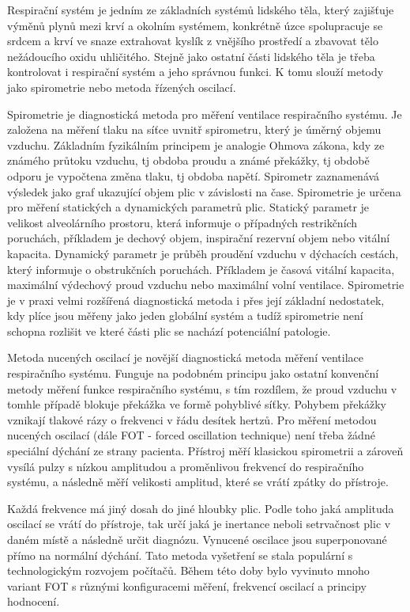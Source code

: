 
Respirační systém je jedním ze základních systémů lidského těla, který zajišťuje výměnů plynů mezi krví a okolním systémem, konkrétně úzce spolupracuje se srdcem a krví ve snaze extrahovat kyslík z vnějšího prostředí a zbavovat tělo nežádoucího oxidu uhličitého. \cite{muni} Stejně jako ostatní části lidského těla je třeba kontrolovat i respirační systém a jeho správnou funkci. K tomu slouží metody jako spirometrie nebo metoda řízených oscilací. 

Spirometrie je diagnostická metoda pro měření ventilace respiračního systému. Je založena na měření tlaku na síťce uvnitř spirometru, který je úměrný objemu vzduchu. \cite{MEFANET} Základním fyzikálním principem je analogie Ohmova zákona, kdy ze známého průtoku vzduchu, tj obdoba proudu a známé překážky, tj obdobě odporu je vypočtena změna tlaku, tj obdoba napětí. Spirometr zaznamenává výsledek jako graf ukazující objem plic v závislosti na čase. \cite{Medicon} Spirometrie je určena pro měření statických a dynamických parametrů plic. Statický parametr  je velikost alveolárního prostoru, která informuje o případných restrikčních poruchách, příkladem je dechový objem, inspirační rezervní objem nebo vitální kapacita. Dynamický parametr je průběh proudění vzduchu v dýchacích cestách, který informuje o obstrukčních poruchách. Příkladem je časová vitální kapacita, maximální výdechový proud vzduchu nebo maximální volní ventilace. \cite{lekfak}
Spirometrie je v praxi velmi rozšířená diagnostická metoda i přes její základní nedostatek, kdy plíce jsou měřeny jako jeden globální systém a tudíž spirometrie není schopna rozlišit ve které části plic se nachází potenciální patologie.

Metoda nucených oscilací je novější diagnostická metoda měření ventilace respiračního systému. Funguje na podobném principu jako ostatní konvenční metody měření funkce respiračního systému, s tím rozdílem, že proud vzduchu v tomhle případě blokuje překážka ve formě pohyblivé síťky. Pohybem překážky vznikají tlakové rázy o frekvenci v řádu desítek hertzů. Pro měření metodou nucených oscilací (dále FOT - forced oscillation technique) není třeba žádné speciální dýchání ze strany pacienta. Přístroj měří klasickou spirometrii a zároveň vysílá pulzy s nízkou amplitudou a proměnlivou frekvencí do respiračního systému, a následně měří velikosti amplitud, které se vrátí zpátky do přístroje. \cite{Oostveen}

Každá frekvence má jiný dosah do jiné hloubky plic. Podle toho jaká amplituda oscilací se vrátí do přístroje,  tak určí jaká je inertance neboli setrvačnost plic v daném místě a následně určit diagnózu. \cite{Oostveen}
Vynucené oscilace jsou superponované přímo na normální dýchání. Tato metoda vyšetření se stala populární s technologickým rozvojem počítačů. \cite{Vlcek2018} Během této doby bylo vyvinuto mnoho variant FOT s různými konfiguracemi měření, frekvencí oscilací a principy hodnocení. 

